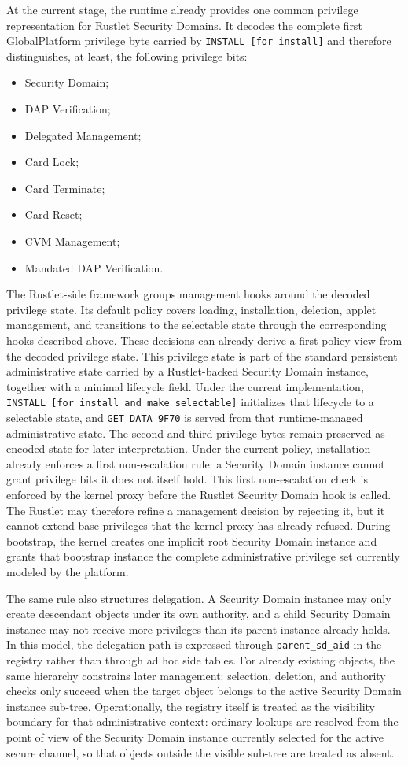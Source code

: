 At the current stage, the runtime already provides one common privilege
representation for Rustlet Security Domains. It decodes the complete
first GlobalPlatform privilege byte carried by
\texttt{INSTALL [for install]} and therefore distinguishes, at least,
the following privilege bits:
\begin{itemize}
\item Security Domain;
\item DAP Verification;
\item Delegated Management;
\item Card Lock;
\item Card Terminate;
\item Card Reset;
\item CVM Management;
\item Mandated DAP Verification.
\end{itemize}

The Rustlet-side framework groups management hooks around the decoded
privilege state. Its default policy covers loading, installation, deletion,
applet management, and transitions to the selectable state through the
corresponding hooks described above. These decisions can already derive a
first policy view from the decoded privilege state. This privilege state is part of the
standard persistent administrative state carried by a Rustlet-backed
Security Domain instance, together with a minimal lifecycle field.
Under the current implementation, \texttt{INSTALL [for install and make
selectable]} initializes that lifecycle to a selectable state, and
\texttt{GET DATA 9F70} is served from that runtime-managed administrative
state. The second and third privilege bytes remain preserved as encoded
state for later interpretation. Under the current policy, installation
already enforces a first non-escalation rule: a Security Domain instance
cannot grant privilege bits it does not itself hold. This first
non-escalation check is enforced by the kernel proxy before the Rustlet
Security Domain hook is called. The Rustlet may therefore refine a
management decision by rejecting it, but it cannot extend base
privileges that the kernel proxy has already refused. During bootstrap,
the kernel creates one implicit root Security Domain instance and grants
that bootstrap instance the complete administrative privilege set currently
modeled by the platform.

The same rule also structures delegation. A Security Domain instance may only
create descendant objects under its own authority, and a child Security Domain
instance may not receive more privileges than its parent instance already
holds. In this model, the delegation path is expressed through
\texttt{parent\_sd\_aid} in the registry rather than through ad hoc side
tables. For already existing objects, the same hierarchy constrains later
management: selection, deletion, and authority checks only succeed when the
target object belongs to the active Security Domain instance sub-tree.
Operationally, the registry itself is treated as the visibility boundary for
that administrative context: ordinary lookups are resolved from the point of
view of the Security Domain instance currently selected for the active secure
channel, so that objects outside the visible sub-tree are treated as absent.

